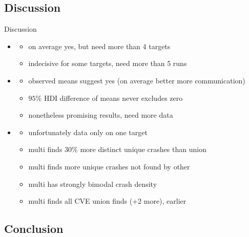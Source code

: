 \documentclass[\HandoutMode,table]{beamer}
\begin{document}
\subsection*{Discussion}

\begin{frame}{Discussion}
    \begin{itemize}
        \item{} 
            \begin{itemize}
                \item{} on average yes, but need more than 4 targets
                \item{} indecisive for some targets, need more than 5 runs
            \end{itemize}
        \item{} 
            \begin{itemize}
                \item{} observed means suggest yes (on average better more
                    communication)
                \item{} $95\%$ HDI difference of means never excludes zero
                \item{} nonetheless promising results, need more data
            \end{itemize}
        \item{} 
            \begin{itemize}
                \item{} unfortunately data only on one target
                \item{} multi finds $30\%$ more distinct unique crashes than union
                \item{} multi finds more unique crashes not found by other
                \item{} multi has strongly bimodal crash density
                \item{} multi finds all CVE union finds (+2 more), earlier
            \end{itemize}
    \end{itemize}
\end{frame}

\subsection*{Conclusion}
\end{document}

